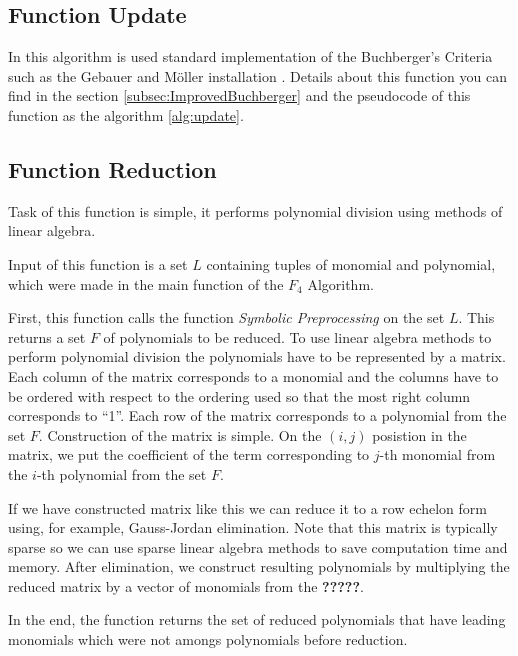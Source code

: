 \subsection{Function Update}
In this algorithm is used standard implementation of the Buchberger's Criteria such as the Gebauer and M\"oller installation \cite{Gebauer-Moller88}. Details about this function you can find in the section \ref{subsec:ImprovedBuchberger} and the pseudocode of this function as the algorithm \ref{alg:update}.

\subsection{Function Reduction}
Task of this function is simple, it performs polynomial division using methods of linear algebra.

Input of this function is a set $L$ containing tuples of monomial and polynomial, which were made in the main function of the $F_4$ Algorithm.

First, this function calls the function \textit{Symbolic Preprocessing} on the set $L$. This returns a set $F$ of polynomials to be reduced. To use linear algebra methods to perform polynomial division the polynomials have to be represented by a matrix. Each column of the matrix corresponds to a monomial and the columns have to be ordered with respect to the ordering used so that the most right column corresponds to ``1''. Each row of the matrix corresponds to a polynomial from the set $F$. Construction of the matrix is simple. On the $(i, j)$ posistion in the matrix, we put the coefficient of the term corresponding to $j$-th monomial from the $i$-th polynomial from the set $F$.

If we have constructed matrix like this we can reduce it to a row echelon form using, for example, Gauss-Jordan elimination. Note that this matrix is typically sparse so we can use sparse linear algebra methods to save computation time and memory. After elimination, we construct resulting polynomials by multiplying the reduced matrix by a vector of monomials from the \textbf{?????}.

In the end, the function returns the set of reduced polynomials that have leading monomials which were not amongs polynomials before reduction.

